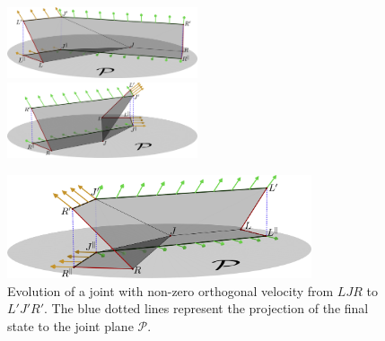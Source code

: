 \begin{figure}[!htb]
\graphicspath{{figures/trapezoidZ}}
    \centering
        \includegraphics[width=0.5\textwidth]{figures/trapezoidZ/trapezoidZ0.pdf}%
        \includegraphics[width=0.5\textwidth]{figures/trapezoidZ/trapezoidZ1.pdf}%

        \includegraphics[width=0.8\textwidth]{figures/trapezoidZ/trapezoidZ2.pdf}%
    \caption{
    Evolution of a joint with non-zero orthogonal velocity from $LJR$ to $L'J'R'$.
    The blue dotted lines represent the projection of the final state to the joint plane $\mathcal P$.
    }
    \label{fig:trapezoidZ}
\end{figure}
